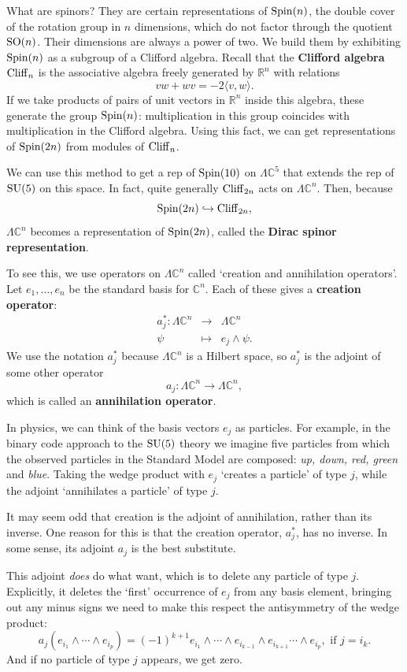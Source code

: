 \documentclass{article}
\newcommand{\maps}{\colon}    %
\newcommand{\R}{{\mathbb R}}  %
\newcommand{\C}{{\mathbb C}}  %
\newcommand{\SO}{{\rm SO}}    %
\newcommand{\SU}{{\rm SU}}    %
\newcommand{\Spin}{{\rm Spin}}    %
\newcommand{\Ex}{\Lambda} %
\newcommand{\Cliff}{{\rm Cliff}}    %
\newcommand{\inclusion}{\hookrightarrow}
\begin{document}
What are spinors? They are certain representations of $\Spin(n)$,
the double cover of the rotation group in $n$ dimensions, which do not factor
through the quotient $\SO(n)$. Their dimensions are always a power of two.
We build them by exhibiting $\Spin(n)$ as a subgroup of a 
Clifford algebra.  Recall that the {\bf Clifford algebra} $\Cliff_n$ is
the associative algebra freely generated by $\R^n$ with relations
\[	v w + w v = -2\langle v, w \rangle .	\]
If we take products of pairs of unit vectors in $\R^n$ inside
this algebra, these generate the group $\Spin(n)$: multiplication 
in this group coincides with multiplication in the Clifford algebra.
Using this fact, we can get representations of $\Spin(2n)$ 
from modules of $\Cliff_n$.  

We can use this method to get a rep of $\Spin(10)$ on $\Lambda \C^5$ 
that extends the rep of $\SU(5)$ on this space.
In fact, quite generally $\Cliff_{2n}$ acts on $\Ex \C^n$.  Then, because
\[ \Spin(2n) \inclusion \Cliff_{2n}, \]
$\Ex \C^n$ becomes a representation of $\Spin(2n)$, called the
\textbf{Dirac spinor representation}.  

To see this, we use operators on $\Ex \C^n$ 
called `creation and annihilation operators'.  Let $e_1, \ldots, e_n$ be the 
standard basis for $\C^n$.  Each of these gives a {\bf creation operator}:
\[ 
\begin{array}{rcl}
     a_j^*  \maps \Ex \C^n &\to& \Ex \C^n    \\
                       \psi &\mapsto& e_j \wedge \psi .
\end{array}\]
We use the notation $a_j^*$ because $\Ex \C^n$ is a Hilbert space,
so $a_j^*$ is the adjoint of some other operator
\[         a_j  \maps \Ex \C^n \to \Ex \C^n  ,   \]
which is called an {\bf annihilation operator}.   

In physics, we can think of the basis vectors $e_j$ as particles.
For example, in the binary code approach to the $\SU(5)$
theory we imagine five particles from which the observed
particles in the Standard Model are composed: {\em{up, down, red, green}}
and {\em blue}.  Taking the wedge product with $e_j$ `creates a particle' 
of type $j$, while the adjoint `annihilates a particle' of type $j$.  

It may seem odd that creation is the adjoint of annihilation, 
rather than its inverse. One reason for this is that the creation 
operator, $a_j^*$, has no inverse.  In some sense, its adjoint $a_j$ 
is the best substitute.

This adjoint \emph{does} do what want, which is to delete any particle of type
$j$.  Explicitly, it deletes the `first' occurrence of $e_j$ from any basis
element, bringing out any minus signs we need to make this respect the
antisymmetry of the wedge product:
\[	a_j ( e_{i_1} \wedge \cdots \wedge e_{i_p} ) = 
( -1 )^{k+1} e_{i_1} \wedge \cdots \wedge e_{i_{k-1}} \wedge e_{i_{k+1}} \cdots \wedge e_{i_p}, \mbox{ if }j=i_k.	\]
And if no particle of type $j$ appears, we get zero.
\end{document}
